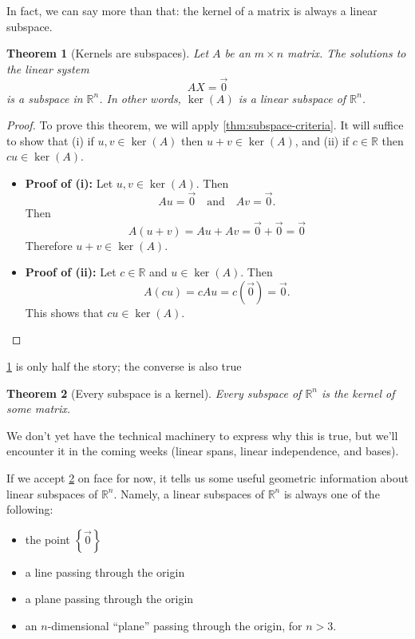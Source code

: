\documentclass[10pt]{article}
\newtheorem{theorem}{Theorem}
\theoremstyle{definition}
\newcommand{\R}{\mathbb{R}}           %
\begin{document}
In fact, we can say more than that: the kernel of a matrix is always a linear subspace.

\begin{theorem}[Kernels are subspaces]
  \label{thm:kernels-are-subspaces}
  Let $A$ be an $m\times n$ matrix. The solutions to the linear system
  \begin{equation*}
    AX=\vec{0}
  \end{equation*}
  is a subspace in $\R^{n}$. In other words, $\ker(A)$ is a linear
  subspace of $\R^{n}$.
\end{theorem}
\begin{proof}
  To prove this theorem, we will apply \cref{thm:subspace-criteria}.
  It will suffice to show that (i) if $u,v\in \ker(A)$ then $u+v\in \ker(A)$,
  and (ii) if $c\in \R$ then $cu\in \ker(A)$.

  \begin{itemize}
    \item \textbf{Proof of (i):}  Let $u,v\in \ker(A)$. Then
    \begin{equation*}
      Au = \vec{0} \quad \text{and} \quad Av=\vec{0}.
    \end{equation*}
    Then
    \begin{equation*}
      A(u+v) = Au+Av = \vec{0}+\vec{0} =\vec{0}
    \end{equation*}
    Therefore $u+v\in \ker(A)$.
    \item \textbf{Proof of (ii):} Let $c\in \R$ and $u\in \ker(A)$. Then
    \begin{equation*}
      A(cu) = cAu = c(\vec{0})=\vec{0}.
    \end{equation*}
    This shows that $cu\in \ker(A)$.
  \end{itemize}
\end{proof}

\cref{thm:kernels-are-subspaces} is only half the story; the converse is also true
\begin{theorem}[Every subspace is a kernel]
  \label{thm:every-subspace-kernel}
  Every subspace of $\R^{n}$ is the kernel of some matrix.
\end{theorem}
We don't yet have the technical machinery to express why this is true, but
we'll encounter it in the coming weeks (linear spans, linear independence, and
bases).

If we accept \cref{thm:every-subspace-kernel} on face for now, it tells us
some useful geometric information about linear subspaces of $\R^{n}$. Namely,
a linear subspaces of $\R^{n}$ is always one of the following:
\begin{itemize}
  \item the point $\left\{\vec{0}\right\} $
  \item a line passing through the origin
  \item a plane passing through the origin
  \item an $n$-dimensional ``plane'' passing through the origin, for $n>3$.
\end{itemize}
\end{document}
